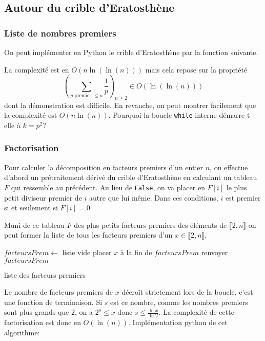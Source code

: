 \subsection{Autour du crible d'Eratosthène}
\subsubsection{Liste de nombres premiers}
On peut implémenter en Python le crible d'Eratosthène par la fonction suivante.

La complexité est en $O(n\ln(\ln(n)))$ mais cela repose sur la propriété
\begin{displaymath}
  \left( \sum_{p\text{ premier }\leq n} \frac{1}{p}\right)_{n\geq 2} \in O(\ln(\ln(n))) 
\end{displaymath}
dont la démonstration est difficile. En revanche, on peut montrer facilement que la complexité est $O(n\ln(n))$.\newline
Pourquoi la boucle \texttt{while} interne démarre-t-elle à $k=p^2$?

\subsubsection{Factorisation}
Pour calculer la décomposition en facteurs premiers d'un entier $n$, on effectue d'abord un prétraitement dérivé du crible d'Eratosthène en calculant un tableau $F$ qui ressemble au précédent. Au lieu de \texttt{False}, on va placer en $F[i]$ le plus petit diviseur premier de $i$ autre que lui même. Dans ces conditions, $i$ est premier si et seulement si $F[i]=0$.

Muni de ce tableau $F$ des plus petits facteurs premiers des éléments de $\llbracket 2,n\rrbracket$ on peut former la liste de tous les facteurs premiers d'un $x\in  \llbracket 2,n\rrbracket$.

\begin{algorithm}
  $facteursPrem \leftarrow$ liste vide \;
  placer $x$ à la fin de $facteursPrem$\;
  renvoyer $facteursPrem$ \;
  \caption{liste des facteurs premiers}
  \label{complexite_4}
\end{algorithm}
Le nombre de facteurs premiers de $x$ décroît strictement lors de la boucle, c'est une fonction de terminaison. Si $s$ est ce nombre, comme les nombres premiers sont plus grands que $2$, on a $2^s \leq x$ donc $s\leq \frac{\ln x}{\ln 2}$. La complexité de cette factorisation est donc en $O(\ln(n))$.\newline
Implémentation python de cet algorithme:


